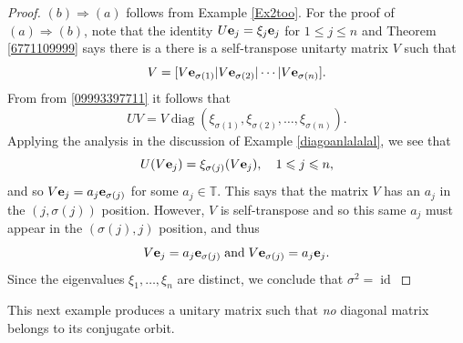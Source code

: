 \documentclass{dis}
\theoremstyle{plain}
\theoremstyle{definition}
\def\T{\mathbb{T}}
\renewcommand{\leq}{\leqslant}
\renewcommand{\vec}[1]{{\bf #1}}
\newcommand{\0}{{\color{lightgray}0}}
\begin{document}
\begin{proof}
$(b) \Longrightarrow (a)$ follows from Example \ref{Ex2too}. For the proof of $(a) \Longrightarrow (b)$, note that the identity $U \vec{e}_j = \xi_j \vec{e}_j$ for $1 \leq j \leq n$ and Theorem \ref{6771109999} says there is a there is a self-transpose unitarty matrix $V$ such that 
$$V = [V\vec{e}_{\sigma(1)} | V\vec{e}_{\sigma(2)} |\cdots |V \vec{e}_{\sigma(n)}].$$
From from \eqref{09993397711} it follows that 
$$U V = V \operatorname{diag}(\xi_{\sigma(1)}, \xi_{\sigma(2)}, \ldots, \xi_{\sigma(n)}).$$
Applying the analysis in the discussion of Example \ref{diagoanlalalal}, we see that 
$$U (V \vec{e}_j) = \xi_{\sigma(j)} (V \vec{e}_j), \quad 1 \leq j  \leq n,$$
and so $V \vec{e}_j = a_j \vec{e}_{\sigma(j)}$ for some $a_j \in \T$. This says that the matrix $V$ has an $a_j$ in the $(j, \sigma(j))$ position. However, $V$ is self-transpose and so this same $a_j$ must appear in the $(\sigma(j), j)$ position, and thus 
$$V \vec{e}_{j}  = a_j \vec{e}_{\sigma(j)} \; \mbox{and} \; V\vec{e}_{\sigma(j)} = a_j \vec{e}_j.$$
Since the eigenvalues $\xi_1, \ldots, \xi_n$ are distinct, we conclude that 
 $\sigma^2 = \operatorname{id}$
\end{proof}

This next example produces a unitary matrix such that {\em no} diagonal matrix  belongs to its conjugate orbit. 
\end{document}
